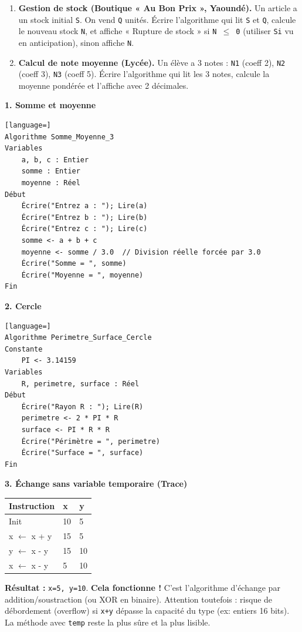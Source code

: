\documentclass[11pt]{article}
\begin{document}
\begin{exercice}
\begin{enumerate}
    \item \textbf{Gestion de stock (Boutique « Au Bon Prix », Yaoundé).} Un article a un stock initial \texttt{S}. On vend \texttt{Q} unités. Écrire l'algorithme qui lit \texttt{S} et \texttt{Q}, calcule le nouveau stock \texttt{N}, et affiche « Rupture de stock » si \texttt{N $\le$ 0} (utiliser \texttt{Si} vu en anticipation), sinon affiche \texttt{N}.
    \item \textbf{Calcul de note moyenne (Lycée).} Un élève a 3 notes : \texttt{N1} (coeff 2), \texttt{N2} (coeff 3), \texttt{N3} (coeff 5). Écrire l'algorithme qui lit les 3 notes, calcule la moyenne pondérée et l'affiche avec 2 décimales.
\end{enumerate}
\end{exercice}

\begin{corrige}
\textbf{1. Somme et moyenne}
\begin{lstlisting}[language=]
Algorithme Somme_Moyenne_3
Variables
    a, b, c : Entier
    somme : Entier
    moyenne : Réel
Début
    Écrire("Entrez a : "); Lire(a)
    Écrire("Entrez b : "); Lire(b)
    Écrire("Entrez c : "); Lire(c)
    somme <- a + b + c
    moyenne <- somme / 3.0  // Division réelle forcée par 3.0
    Écrire("Somme = ", somme)
    Écrire("Moyenne = ", moyenne)
Fin
\end{lstlisting}

\textbf{2. Cercle}
\begin{lstlisting}[language=]
Algorithme Perimetre_Surface_Cercle
Constante
    PI <- 3.14159
Variables
    R, perimetre, surface : Réel
Début
    Écrire("Rayon R : "); Lire(R)
    perimetre <- 2 * PI * R
    surface <- PI * R * R
    Écrire("Périmètre = ", perimetre)
    Écrire("Surface = ", surface)
Fin
\end{lstlisting}

\textbf{3. Échange sans variable temporaire (Trace)}
\begin{center}
\begin{tabularx}{\linewidth}{|l|X|X|}\hline
\rowcolor{popblue}\textbf{Instruction} & \textbf{x} & \textbf{y} \\\hline
Init & 10 & 5 \\\hline
x $\leftarrow$ x + y & 15 & 5 \\\hline
y $\leftarrow$ x - y & 15 & 10 \\\hline
x $\leftarrow$ x - y & 5 & 10 \\\hline
\end{tabularx}
\end{center}
\textbf{Résultat :} \texttt{x=5, y=10}. \textbf{Cela fonctionne !} C'est l'algorithme d'échange par addition/soustraction (ou XOR en binaire). Attention toutefois : risque de débordement (overflow) si \texttt{x+y} dépasse la capacité du type (ex: entiers 16 bits). La méthode avec \texttt{temp} reste la plus sûre et la plus lisible.
\end{corrige}
\end{document}
